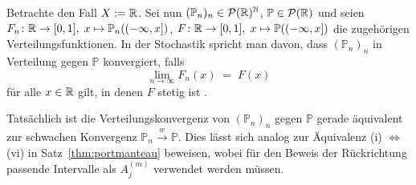 \documentclass[../main/main.tex]{subfiles}
\begin{document}
	\begin{Bemerkung}[Verteilungskonvergenz]
		Betrachte den Fall $X := \mathbb{R}$. Sei nun $(\mathbb{P}_n)_n \in \mathcal{P}(\mathbb{R})^{\mathbb{N}}$,  $\mathbb{P} \in \mathcal{P}(\mathbb{R})$ und seien $F_n \colon \mathbb{R} \to [0, 1], \; x \mapsto \mathbb{P}_n((-\infty, x]) $, $F \colon \mathbb{R} \to [0, 1], \; x \mapsto \mathbb{P}((-\infty, x]) $ die zugehörigen Verteilungsfunktionen. In der Stochastik spricht man davon, dass $(\mathbb{P}_n)_n$ in Verteilung gegen $\mathbb{P}$ konvergiert, falls 
		\[ \lim_{n \to \infty} F_n(x) \; = \; F(x) \]
		für alle $x \in \mathbb{R}$ gilt, in denen $F$ stetig ist \cite[Definition 6.1]{Henze.2016}. 
		
		Tatsächlich ist die Verteilungskonvergenz von $(\mathbb{P}_n)_n$ gegen $\mathbb{P}$ gerade äquivalent zur schwachen Konvergenz $\mathbb{P}_n \xrightarrow{w} \mathbb{P}$. Dies lässt sich analog zur Äquivalenz (i) $\Leftrightarrow$ (vi) in Satz~\ref{thm:portmanteau} beweisen, wobei für den Beweis der Rückrichtung passende Intervalle als $A_j^{(m)}$ verwendet werden müssen.
	\end{Bemerkung}
	
\end{document}
